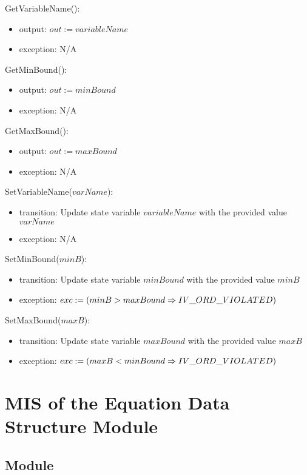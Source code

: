 \documentclass[12pt, titlepage]{article}
\begin{document}
\noindent GetVariableName():
\begin{itemize}
	\item output: $out := variableName$
	\item exception: N/A
\end{itemize}

\noindent GetMinBound():
\begin{itemize}
	\item output: $out := minBound$
	\item exception: N/A
\end{itemize}

\noindent GetMaxBound():
\begin{itemize}
	\item output: $out := maxBound$
	\item exception: N/A
\end{itemize}

\noindent SetVariableName($varName$):
\begin{itemize}
	\item transition: Update state variable $variableName$ with the provided 
	value $varName$
	\item exception: N/A
\end{itemize}

\noindent SetMinBound($minB$):
\begin{itemize}
	\item transition: Update state variable $minBound$ with the provided value 
	$minB$
	\item exception: $exc := \\
	(minB > maxBound \Rightarrow IV\_ORD\_VIOLATED)$
\end{itemize}

\noindent SetMaxBound($maxB$):
\begin{itemize}
	\item transition: Update state variable $maxBound$ with the provided value 
	$maxB$
	\item exception: $exc := \\
	(maxB < minBound \Rightarrow IV\_ORD\_VIOLATED)$
\end{itemize}

\newpage

\section{MIS of the Equation Data Structure Module} 
\label{Module_equationdatastructure}

\subsection{Module}
\end{document}
